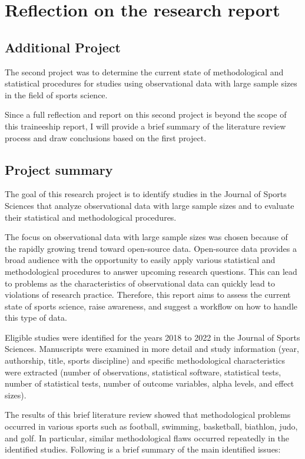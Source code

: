 \section{Reflection on the research report}
\label{Sample_Size}

\subsection{Additional Project}
The second project was to determine the current state of methodological and statistical procedures for studies using observational data with large sample sizes in the field of sports science.

Since a full reflection and report on this second project is beyond the scope of this traineeship report, I will provide a brief summary of the literature review process and draw conclusions based on the first project.


\subsection{Project summary}
The goal of this research project is to identify studies in the Journal of Sports Sciences that analyze observational data with large sample sizes and to evaluate their statistical and methodological procedures.

The focus on observational data with large sample sizes was chosen because of the rapidly growing trend toward open-source data. Open-source data provides a broad audience with the opportunity to easily apply various statistical and methodological procedures to answer upcoming research questions. This can lead to problems as the characteristics of observational data can quickly lead to violations of research practice. Therefore, this report aims to assess the current state of sports science, raise awareness, and suggest a workflow on how to handle this type of data.

Eligible studies were identified for the years 2018 to 2022 in the Journal of Sports Sciences. Manuscripts were examined in more detail and study information (year, authorship, title, sports discipline) and specific methodological characteristics were extracted (number of observations, statistical software, statistical tests, number of statistical tests, number of outcome variables, alpha levels, and effect sizes).

The results of this brief literature review showed that methodological problems occurred in various sports such as football, swimming, basketball, biathlon, judo, and golf. In particular, similar methodological flaws occurred repeatedly in the identified studies.
\newline
Following is a brief summary of the main identified issues:

